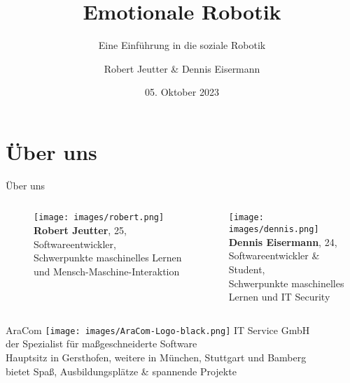 \documentclass[aspectratio=169]{beamer}
\title{Emotionale Robotik}
\subtitle{Eine Einführung in die soziale Robotik}
\author{Robert Jeutter \& Dennis Eisermann}
\date{05. Oktober 2023}
\begin{document}
\maketitle

\section{Über uns}
\begin{frame}{Über uns}
  \begin{columns}
    \begin{column}{0.45\textwidth}
      \begin{figure}[h]
        \centering
        \texttt{[image: images/robert.png]}\\
        \textbf{Robert Jeutter}, 25,\\
        Softwareentwickler,\\
        \scriptsize{Schwerpunkte maschinelles Lernen und Mensch-Maschine-Interaktion}
      \end{figure}
    \end{column}
    \begin{column}{0.45\textwidth}
      \texttt{[image: images/dennis.png]}\\
      \textbf{Dennis Eisermann}, 24,\\
      Softwareentwickler \& Student,\\
      \scriptsize{Schwerpunkte maschinelles Lernen und IT Security}
    \end{column}
  \end{columns}
\end{frame}
\begin{frame}{AraCom}
  \texttt{[image: images/AraCom-Logo-black.png]}
  IT Service GmbH\\
  der Spezialist für maßgeschneiderte Software\\
  Hauptsitz in Gersthofen, weitere in München, Stuttgart und Bamberg\\
  bietet Spaß, Ausbildungsplätze \& spannende Projekte
\end{frame}
\end{document}
